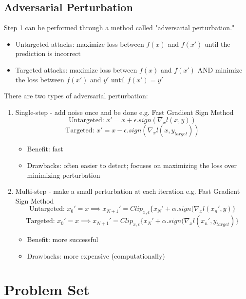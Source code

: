 \documentclass{article}
\begin{document}
\subsection{Adversarial Perturbation}
Step 1 can be performed through a method called "adversarial perturbation." 
\begin{itemize}
    \item Untargeted attacks: maximize loss between $f(x)$ and $f(x')$ until the prediction is incorrect
    \item Targeted attacks: maximize loss between $f(x)$ and $f(x')$ AND minimize the loss between $f(x')$ and $y'$ until $f(x') = y'$
\end{itemize}

There are two types of adversarial perturbation:
\begin{enumerate}
    \item Single-step - add noise once and be done
e.g. Fast Gradient Sign Method
$$\text{Untargeted: }x' = x + \epsilon.sign(\nabla_xl(x,y))$$
$$\text{Targeted: }x' = x - \epsilon.sign(\nabla_xl(x,y_{target}))$$
\begin{itemize}
    \item Benefit: fast
    \item Drawbacks: often easier to detect; focuses on maximizing the loss over minimizing perturbation
\end{itemize}
\item Multi-step - make a small perturbation at each iteration
e.g. Fast Gradient Sign Method
$$\text{Untargeted: }x_0' = x \implies x_{N+1}' = Clip_{x,\epsilon}\{x_N' + \alpha.sign(\nabla_xl(x_n', y)\} $$
$$\text{Targeted: }x_0' = x \implies x_{N+1}' = Clip_{x,\epsilon}\{x_N' + \alpha.sign(\nabla_xl(x_n', y_{target})\} $$
\begin{itemize}
    \item Benefit: more successful
    \item Drawbacks: more expensive (computationally)
\end{itemize}
\end{enumerate}

\section{Problem Set}
\end{document}
